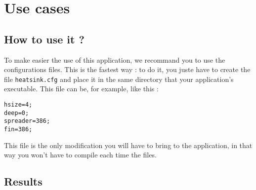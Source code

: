\section{Use cases}
\subsection{How to use it ?}
To make easier the use of this application, we recommand you to use the configurations files. This is the fastest way : to do it, you juste have to create the file \lstinline!heatsink.cfg! and place it in the same directory that your application's executable. This file can be, for example, like this :
\begin{lstlisting}
hsize=4;
deep=0;
spreader=386;
fin=386;
\end{lstlisting}
This file is the only modification you will have to bring to the application, in that way you won't have to compile each time the files.

\subsection{Results}

